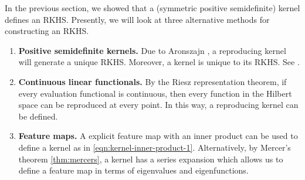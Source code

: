 In the previous section, we showed that a (symmetric positive semidefinite) kernel defines an RKHS.
Presently, we will look at three alternative methods for constructing an RKHS.
\begin{enumerate}
    \item \textbf{Positive semidefinite kernels.}
    Due to Aronszajn \cite{aronszajn1950theory}, a reproducing kernel will generate a unique RKHS.
    Moreover, a kernel is unique to its RKHS.
    See .
    \item \textbf{Continuous linear functionals.}
    By the Riesz representation theorem, if every evaluation functional is continuous, then every function in the Hilbert space can be reproduced at every point.
    In this way, a reproducing kernel can be defined.
    \item \textbf{Feature maps.}
    A explicit feature map with an inner product can be used to define a kernel as in \cref{eqn:kernel-inner-product-1}.
    Alternatively, by Mercer's theorem \ref{thm:mercers}, a kernel has a series expansion which allows us to define a feature map in terms of eigenvalues and eigenfunctions.
\end{enumerate}